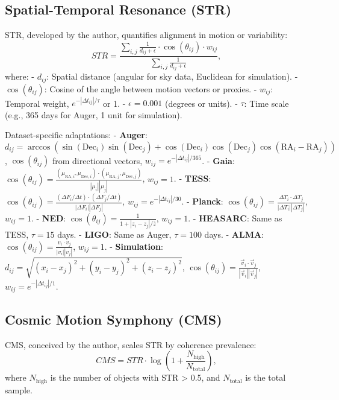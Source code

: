 \documentclass[12pt, twocolumn]{article}
\begin{document}
\subsection{Spatial-Temporal Resonance (STR)}
STR, developed by the author, quantifies alignment in motion or variability:
\begin{equation}
    STR = \frac{\sum_{i,j} \frac{1}{d_{ij} + \epsilon} \cdot \cos(\theta_{ij}) \cdot w_{ij}}{\sum_{i,j} \frac{1}{d_{ij} + \epsilon}},
    \label{eq:str}
\end{equation}
where:
- \(d_{ij}\): Spatial distance (angular for sky data, Euclidean for simulation).
- \(\cos(\theta_{ij})\): Cosine of the angle between motion vectors or proxies.
- \(w_{ij}\): Temporal weight, \(e^{-|\Delta t_{ij}| / \tau}\) or 1.
- \(\epsilon = 0.001\) (degrees or units).
- \(\tau\): Time scale (e.g., 365 days for Auger, 1 unit for simulation).

Dataset-specific adaptations:
- \textbf{Auger}: \(d_{ij} = \arccos(\sin(\text{Dec}_i) \sin(\text{Dec}_j) + \cos(\text{Dec}_i) \cos(\text{Dec}_j) \cos(\text{RA}_i - \text{RA}_j))\), \(\cos(\theta_{ij})\) from directional vectors, \(w_{ij} = e^{-|\Delta t_{ij}| / 365}\).
- \textbf{Gaia}: \(\cos(\theta_{ij}) = \frac{(\mu_{\text{RA},i}, \mu_{\text{Dec},i}) \cdot (\mu_{\text{RA},j}, \mu_{\text{Dec},j})}{|\mu_i| |\mu_j|}\), \(w_{ij} = 1\).
- \textbf{TESS}: \(\cos(\theta_{ij}) = \frac{(\Delta F_i / \Delta t) \cdot (\Delta F_j / \Delta t)}{|\Delta F_i| |\Delta F_j|}\), \(w_{ij} = e^{-|\Delta t_{ij}| / 30}\).
- \textbf{Planck}: \(\cos(\theta_{ij}) = \frac{\Delta T_i \cdot \Delta T_j}{|\Delta T_i| |\Delta T_j|}\), \(w_{ij} = 1\).
- \textbf{NED}: \(\cos(\theta_{ij}) = \frac{1}{1 + |z_i - z_j| / \bar{z}}\), \(w_{ij} = 1\).
- \textbf{HEASARC}: Same as TESS, \(\tau = 15\) days.
- \textbf{LIGO}: Same as Auger, \(\tau = 100\) days.
- \textbf{ALMA}: \(\cos(\theta_{ij}) = \frac{v_i \cdot v_j}{|v_i| |v_j|}\), \(w_{ij} = 1\).
- \textbf{Simulation}: \(d_{ij} = \sqrt{(x_i - x_j)^2 + (y_i - y_j)^2 + (z_i - z_j)^2}\), \(\cos(\theta_{ij}) = \frac{\vec{v}_i \cdot \vec{v}_j}{|\vec{v}_i| |\vec{v}_j|}\), \(w_{ij} = e^{-|\Delta t_{ij}| / 1}\).

\subsection{Cosmic Motion Symphony (CMS)}
CMS, conceived by the author, scales STR by coherence prevalence:
\begin{equation}
    CMS = STR \cdot \log\left(1 + \frac{N_{\text{high}}}{N_{\text{total}}}\right),
    \label{eq:cms}
\end{equation}
where \(N_{\text{high}}\) is the number of objects with STR > 0.5, and \(N_{\text{total}}\) is the total sample.
\end{document}
